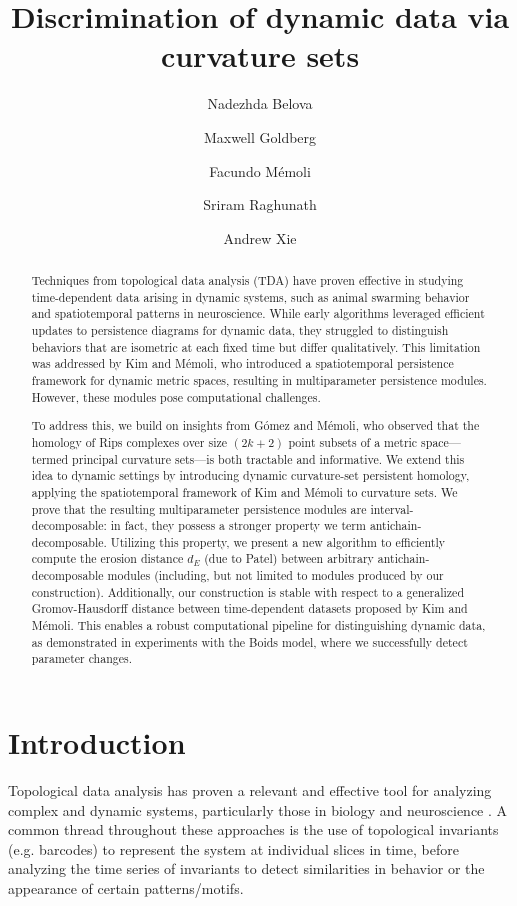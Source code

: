 \documentclass[a4paper,UKenglish,thm-restate]{article}
\title{Discrimination of dynamic data via curvature sets}
\author[1]{Nadezhda Belova}
\author[1]{Maxwell Goldberg}
\author[1]{Facundo M\'emoli}
\author[1]{Sriram Raghunath}
\author[1]{Andrew Xie}
\affil[1]{Department of Mathematics, Rutgers University}
\theoremstyle{definition}
\begin{document}
\maketitle

\begin{abstract}
    Techniques from topological data analysis (TDA) have proven effective in studying time-dependent data arising in dynamic systems, such as animal swarming behavior and spatiotemporal patterns in neuroscience. While early algorithms leveraged efficient updates to persistence diagrams for dynamic data, they struggled to distinguish behaviors that are isometric at each fixed time but differ qualitatively. This limitation was addressed by Kim and Mémoli, who introduced a spatiotemporal persistence framework for dynamic metric spaces, resulting in multiparameter persistence modules. However, these modules pose computational challenges.

    To address this, we build on insights from Gómez and Mémoli, who observed that the homology of Rips complexes over size $(2k+2)$ point subsets of a metric space—termed principal curvature sets—is both tractable and informative. We extend this idea to dynamic settings by introducing dynamic curvature-set persistent homology, applying the spatiotemporal framework of Kim and Mémoli to curvature sets. We prove that the resulting multiparameter persistence modules are interval-decomposable: in fact, they possess a stronger property we term antichain-decomposable. Utilizing this property, we present a new algorithm to efficiently compute the erosion distance $d_E$ (due to Patel) between arbitrary antichain-decomposable modules (including, but not limited to modules produced by our construction). Additionally, our construction is stable with respect to a generalized Gromov-Hausdorff distance between time-dependent datasets proposed by Kim and Mémoli. This enables a robust computational pipeline for distinguishing dynamic data, as demonstrated in experiments with the Boids model, where we successfully detect parameter changes.
\end{abstract}

\section{Introduction}
    Topological data analysis has proven a relevant and effective tool for analyzing complex and dynamic systems, particularly those in biology and neuroscience \cite{Songdechakraiwut2020, Ciocanel2021, Catanzaro2024}. A common thread throughout these approaches is the use of topological invariants (e.g. barcodes) to represent the system at individual slices in time, before analyzing the time series of invariants to detect similarities in behavior or the appearance of certain patterns/motifs.
    
\end{document}

